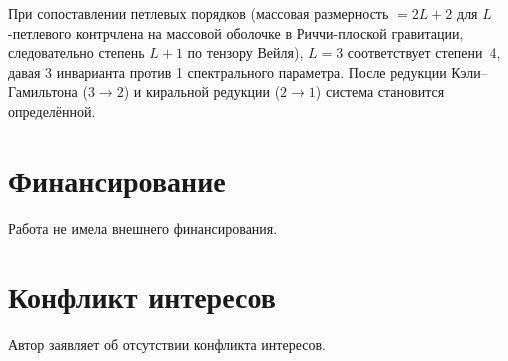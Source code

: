 \documentclass[12pt,a4paper]{article}
\theoremstyle{definition}
\theoremstyle{remark}
\begin{document}
При сопоставлении петлевых порядков (массовая размерность $= 2L + 2$ для
$L$-петлевого контрчлена на массовой оболочке в Риччи-плоской гравитации,
следовательно степень $L + 1$ по тензору Вейля), $L = 3$ соответствует
степени~4, давая 3 инварианта против 1 спектрального параметра.  После
редукции Кэли--Гамильтона ($3 \to 2$) и киральной редукции ($2 \to 1$)
система становится определённой.


\section*{Финансирование}

Работа не имела внешнего финансирования.

\section*{Конфликт интересов}

Автор заявляет об отсутствии конфликта интересов.



\end{document}
